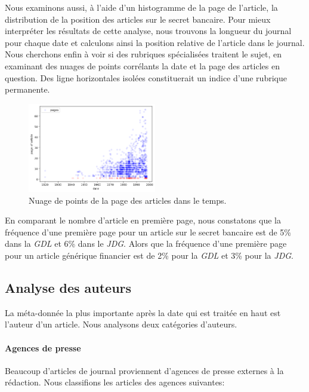 \documentclass[11pt]{article}
\begin{document}
Nous examinons aussi, à l'aide d'un histogramme de la page de l'article,
la distribution de la position des articles sur le secret bancaire. Pour
mieux interpréter les résultats de cette analyse, nous trouvons la
longueur du journal pour chaque date et calculons ainsi la position
relative de l'article dans le journal. Nous cherchons enfin à voir si
des rubriques spécialisées traitent le sujet, en examinant des nuages de
points corrélants la date et la page des articles en question. Des ligne
horizontales isolées constituerait un indice d'une rubrique permanente.

\begin{figure}
\centering
\includegraphics[width=0.5\textwidth ]{methodology/scatter.png}
\caption{Nuage de points de la page des articles dans le temps.}
\end{figure}

En comparant le nombre d'article en première page, nous constatons que
la fréquence d'une première page pour un article sur le secret bancaire
est de 5\% dans la \emph{GDL} et 6\% dans le \emph{JDG}. Alors que la
fréquence d'une première page pour un article générique financier est de
2\% pour la \emph{GDL} et 3\% pour la \emph{JDG}.

\hypertarget{analyse-des-auteurs}{%
\subsection{Analyse des auteurs}\label{analyse-des-auteurs}}

La méta-donnée la plus importante après la date qui est traitée en haut
est l'auteur d'un article. Nous analysons deux catégories d'auteurs.

\hypertarget{agences-de-presse}{%
\paragraph{Agences de presse}\label{agences-de-presse}}

Beaucoup d'articles de journal proviennent d'agences de presse externes
à la rédaction. Nous classifions les articles des agences suivantes:
\end{document}
